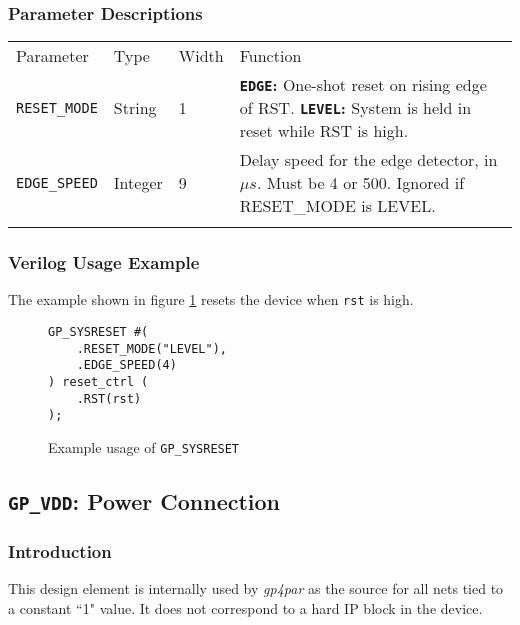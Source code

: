 \documentclass[11pt]{article}
\newcommand{\namestyle}[1]{\textit{#1}}
\newcommand{\tokenstyle}[1]{\texttt{#1}}
\newcommand{\wirestyle}[1]{\texttt{#1}}
\newcommand{\valuestyle}[1]{\texttt{#1}}
\newcommand{\strvaluestyle}[1]{\valuestyle{\textquotedbl#1\textquotedbl}}
\newcommand{\strexamplestyle}[1]{\textbf{\strvaluestyle{#1}:}}
\newcommand{\whenstyle}[1]{{\fontseries{sb}\selectfont#1}}
\newcommand{\thinhline}{\Xhline{1\arrayrulewidth}}
\newcommand{\thickhline}{\Xhline{2.5\arrayrulewidth}}
\begin{document}
\subsubsection{Parameter Descriptions}

\begin{tabularx}{\textwidth}{lllX}
\thinhline
\whenstyle{Parameter} & \whenstyle{Type} & \whenstyle{Width} & \whenstyle{Function} \\
\thickhline
\tokenstyle{RESET\_MODE} & String & 1 &
	\strexamplestyle{EDGE} One-shot reset on rising edge of RST. \newline
	\strexamplestyle{LEVEL} System is held in reset while RST is high.\\
\tokenstyle{EDGE\_SPEED} & Integer & 9 &
	Delay speed for the edge detector, in $\mu s$. Must be 4 or 500. \newline
	Ignored if RESET\_MODE is LEVEL.\\
\thinhline
\end{tabularx}

\subsubsection{Verilog Usage Example}

The example shown in figure \ref{gp-sysreset-example} resets the device when \wirestyle{rst} is high.

\begin{figure}[h]
\begin{lstlisting}
GP_SYSRESET #(
	.RESET_MODE("LEVEL"),
	.EDGE_SPEED(4)
) reset_ctrl (
	.RST(rst)
);
\end{lstlisting}
\caption{Example usage of \tokenstyle{GP\_SYSRESET}}
\label{gp-sysreset-example}
\end{figure}


\FloatBarrier
\pagebreak
\subsection{\tokenstyle{GP\_VDD}: Power Connection}

\subsubsection{Introduction}
This design element is internally used by \namestyle{gp4par} as the source for all nets tied to a constant ``1" value. It does not correspond to a hard IP block in the device.
\end{document}
